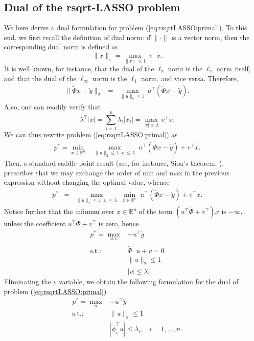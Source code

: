 \documentclass[11pt]{article}
\newcommand{\tran}{^{\top}}
\newcommand{\lam}{\lambda}
\newcommand{\bea}{\begin{eqnarray}}
\newcommand{\eea}{\end{eqnarray}}
\newcommand{\beas}{\begin{eqnarray*}}
\newcommand{\eeas}{\end{eqnarray*}}
\newcommand{\Real}[1]{ { {\mathbb R}^{#1} } }
\begin{document}
\subsection{Dual of the rsqrt-LASSO problem}
We here derive a dual formulation for problem (\ref{eq:rsqrtLASSO:primal}).  To this end, we first recall the definition of dual norm: if $\|\cdot\|$ is a vector norm, then the corresponding dual norm is defined as
\[
\|x\|_\star \doteq \max_{\|v\|\leq 1} \, v\tran x.
\]
It is well known, for instance, that the dual of the $\ell_2$ norm is the $\ell_2$ norm itself, and that
the dual of the $\ell_\infty$ norm is the $\ell_1$ norm, and vice versa. Therefore,
\beas
\|\tilde \Phi x -\tilde y\|_2 &=& \max_{\|u\|_2\leq 1} \, u\tran (\tilde \Phi x - \tilde y).
\eeas
Also, one can readily verify that
\[
\lam\tran |x| = \sum_{i=1}^n \lam_i |x_i| = \max_{|v| \leq \lam } \, v\tran x.
\]
We can  thus rewrite problem (\ref{eq:rsqrtLASSO:primal}) as
\beas
p^*  =\min_{x\in\Real{n}} & \displaystyle{\max_{\|u\|_2\leq 1,    |v| \leq \lam}} \;
u\tran (\tilde \Phi x - \tilde y) +  v\tran x.
\eeas
Then, a standard saddle-point result (see, for instance, Sion's theorem, \cite{Komiya:88,Sion:58}), 
prescribes that we may exchange the order of min and max in the previous expression without changing the optimal value, whence
\beas
p^*  & = & \displaystyle{\max_{\|u\|_2\leq 1,   |v| \leq \lam}} \;  \displaystyle{\min_{x\in\Real{n}}} \;
u\tran (\tilde \Phi x - \tilde y)  +  v\tran x.
\eeas
Notice further that the infimum over $x\in\Real{n}$ of the term $(u\tran \tilde \Phi +  v\tran)x $ is $-\infty$, unless the coefficient
$u\tran \tilde \Phi  +  v\tran$ is zero, hence
\beas
p^*  = \displaystyle{\max_{u,v}} & 
-u\tran  \tilde y \\
\mbox{s.t.:} & \tilde \Phi\tran u   +  v = 0 \\
&\|u\|_2\leq 1 \\
& |v| \leq \lam.
\eeas
Eliminating the $v$ variable, we obtain the following  formulation
for the dual of  problem (\ref{eq:rsqrtLASSO:primal})  
 \bea
p^*  = \displaystyle{\max_{u}} & 
-u\tran  \tilde y   \label{eq:rsqrtLASSO:dual} \\
\mbox{s.t.:} & \|u\|_2\leq 1 \nonumber \\
& |\tilde \phi_i\tran u | \leq \lam_i , &  i=1,\ldots, n. \label{eq:rsqrtLASSO:dual_cinf} 
\eea
\end{document}
